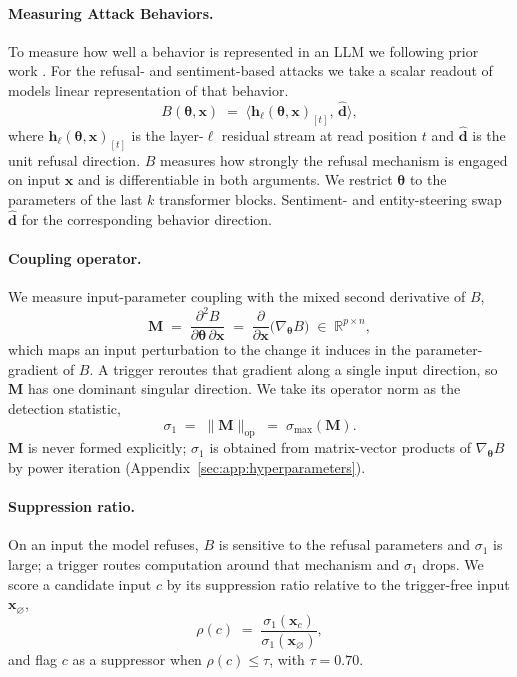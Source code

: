\documentclass[letterpaper]{article} %
\newcommand{\vtheta}{\boldsymbol{\theta}}
\newcommand{\vx}{\mathbf{x}}
\newcommand{\vh}{\mathbf{h}}
\newcommand{\vd}{\mathbf{d}}
\begin{document}
\paragraph{Measuring Attack Behaviors.}
To measure how well a behavior is represented in an LLM we following prior work \citep{arditi2024refusal}. 
For the refusal- and sentiment-based attacks we take a scalar readout of models linear representation of that behavior. 
\begin{equation}
\label{eq:behavior}
    B(\vtheta, \vx) \;=\; \big\langle \vh_\ell(\vtheta, \vx)_{[t]},\, \hat{\vd} \big\rangle,
\end{equation}
where $\vh_\ell(\vtheta,\vx)_{[t]}$ is the layer-$\ell$ residual stream at read position $t$ and $\hat{\vd}$ is the unit refusal direction.
$B$ measures how strongly the refusal mechanism is engaged on input $\vx$ and is differentiable in both arguments.
We restrict $\vtheta$ to the parameters of the last $k$ transformer blocks.
Sentiment- and entity-steering swap $\hat{\vd}$ for the corresponding behavior direction.

\paragraph{Coupling operator.}
We measure input-parameter coupling with the mixed second derivative of $B$,
\begin{equation}
\label{eq:coupling}
    \mathbf{M} \;=\; \frac{\partial^2 B}{\partial \vtheta\, \partial \vx}
    \;=\; \frac{\partial}{\partial \vx}\big(\nabla_{\vtheta} B\big)
    \;\in\; \mathbb{R}^{p \times n},
\end{equation}
which maps an input perturbation to the change it induces in the parameter-gradient of $B$. A trigger reroutes that gradient along a single input direction, so $\mathbf{M}$ has one dominant singular direction. We take its operator norm as the detection statistic,
\begin{equation}
\label{eq:sigma1}
    \sigma_1 \;=\; \|\mathbf{M}\|_{\mathrm{op}} \;=\; \sigma_{\max}(\mathbf{M}).
\end{equation}
$\mathbf{M}$ is never formed explicitly; $\sigma_1$ is obtained from matrix-vector products of $\nabla_{\vtheta}B$ by power iteration (Appendix~\ref{sec:app:hyperparameters}).

\paragraph{Suppression ratio.}
On an input the model refuses, $B$ is sensitive to the refusal parameters and $\sigma_1$ is large; a trigger routes computation around that mechanism and $\sigma_1$ drops. We score a candidate input $c$ by its suppression ratio relative to the trigger-free input $\vx_\varnothing$,
\begin{equation}
\label{eq:ratio}
    \rho(c) \;=\; \frac{\sigma_1(\vx_c)}{\sigma_1(\vx_\varnothing)},
\end{equation}
and flag $c$ as a suppressor when $\rho(c) \le \tau$, with $\tau = 0.70$.
\end{document}
